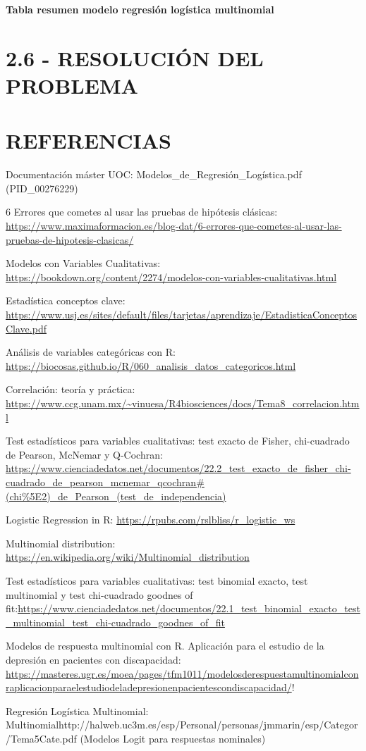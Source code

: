 \documentclass[
]{article}
\begin{document}
\textbf{Tabla resumen modelo regresión logística multinomial}

\hypertarget{resoluciuxf3n-del-problema}{%
\section{2.6 - RESOLUCIÓN DEL
PROBLEMA}\label{resoluciuxf3n-del-problema}}

\hypertarget{referencias}{%
\section{REFERENCIAS}\label{referencias}}

Documentación máster UOC: Modelos\_de\_Regresión\_Logística.pdf
(PID\_00276229)

6 Errores que cometes al usar las pruebas de hipótesis clásicas:
\url{https://www.maximaformacion.es/blog-dat/6-errores-que-cometes-al-usar-las-pruebas-de-hipotesis-clasicas/}

Modelos con Variables Cualitativas:
\url{https://bookdown.org/content/2274/modelos-con-variables-cualitativas.html}

Estadística conceptos clave:
\url{https://www.usj.es/sites/default/files/tarjetas/aprendizaje/EstadisticaConceptosClave.pdf}

Análisis de variables categóricas con R:
\url{https://biocosas.github.io/R/060_analisis_datos_categoricos.html}

Correlación: teoría y práctica:
\url{https://www.ccg.unam.mx/~vinuesa/R4biosciences/docs/Tema8_correlacion.html}

Test estadísticos para variables cualitativas: test exacto de Fisher,
chi-cuadrado de Pearson, McNemar y Q-Cochran:
\url{https://www.cienciadedatos.net/documentos/22.2_test_exacto_de_fisher_chi-cuadrado_de_pearson_mcnemar_qcochran\#(chi\%5E2)_de_Pearson_(test_de_independencia)}

Logistic Regression in R: \url{https://rpubs.com/rslbliss/r_logistic_ws}

Multinomial distribution:
\url{https://en.wikipedia.org/wiki/Multinomial_distribution}

Test estadísticos para variables cualitativas: test binomial exacto,
test multinomial y test chi-cuadrado goodnes of
fit:\url{https://www.cienciadedatos.net/documentos/22.1_test_binomial_exacto_test_multinomial_test_chi-cuadrado_goodnes_of_fit}

Modelos de respuesta multinomial con R. Aplicación para el estudio de la
depresión en pacientes con discapacidad:
\url{https://masteres.ugr.es/moea/pages/tfm1011/modelosderespuestamultinomialconraplicacionparaelestudiodeladepresionenpacientescondiscapacidad/}!

Regresión Logística Multinomial:
Multinomialhttp://halweb.uc3m.es/esp/Personal/personas/jmmarin/esp/Categor/Tema5Cate.pdf
(Modelos Logit para respuestas nominales)
\end{document}

